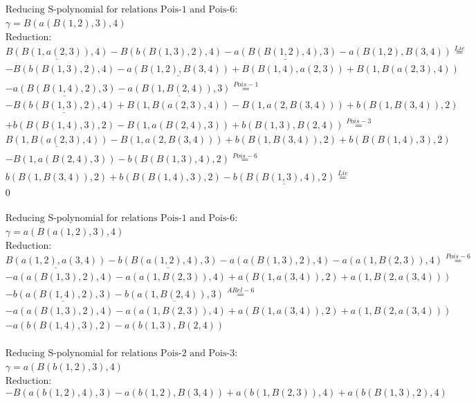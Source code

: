 \documentclass[11pt]{amsart}
\begin{document}
\begin{align*} 
& \text{Reducing S-polynomial for relations Pois-1 and Pois-6:} \\ 
& \gamma = B(a(B(1,2),3),4) \\ 
& \text{Reduction}: \\&\underline{B(B(1,a(2,3)),4)} - B(b(B(1,3),2),4) - \underline{a(B(B(1,2),4),3)} - a(B(1,2),B(3,4)) \stackrel{ Lie }{=}  \\ 
& - B(b(B(1,3),2),4) - \underline{a(B(1,2),B(3,4))} + B(B(1,4),a(2,3)) + B(1,B(a(2,3),4))\\ 
 &  - \underline{a(B(B(1,4),2),3)} - \underline{a(B(1,B(2,4)),3)} \stackrel{ Pois-1 }{=}  \\ 
& - \underline{B(b(B(1,3),2),4)} + B(1,B(a(2,3),4)) - B(1,a(2,B(3,4))) + b(B(1,B(3,4)),2)\\ 
 &  + b(B(B(1,4),3),2) - B(1,a(B(2,4),3)) + b(B(1,3),B(2,4)) \stackrel{ Pois-3 }{=}  \\ 
&\underline{B(1,B(a(2,3),4))} - B(1,a(2,B(3,4))) + b(B(1,B(3,4)),2) + b(B(B(1,4),3),2)\\ 
 &  - B(1,a(B(2,4),3)) - b(B(B(1,3),4),2) \stackrel{ Pois-6 }{=}  \\ 
&b(B(1,B(3,4)),2) + b(B(B(1,4),3),2) - \underline{b(B(B(1,3),4),2)} \stackrel{ Lie }{=}  \\ 
&0\\ 
\end{align*} 
 
\begin{align*} 
& \text{Reducing S-polynomial for relations Pois-1 and Pois-6:} \\ 
& \gamma = a(B(a(1,2),3),4) \\ 
& \text{Reduction}: \\&\underline{B(a(1,2),a(3,4))} - \underline{b(B(a(1,2),4),3)} - a(a(B(1,3),2),4) - a(a(1,B(2,3)),4) \stackrel{ Pois-6 }{=}  \\ 
& - a(a(B(1,3),2),4) - a(a(1,B(2,3)),4) + a(B(1,a(3,4)),2) + a(1,B(2,a(3,4)))\\ 
 &  - \underline{b(a(B(1,4),2),3)} - \underline{b(a(1,B(2,4)),3)} \stackrel{ ARel-6 }{=}  \\ 
& - a(a(B(1,3),2),4) - a(a(1,B(2,3)),4) + a(B(1,a(3,4)),2) + a(1,B(2,a(3,4)))\\ 
 &  - a(b(B(1,4),3),2) - a(b(1,3),B(2,4))\\ 
\end{align*} 
 
\begin{align*} 
& \text{Reducing S-polynomial for relations Pois-2 and Pois-3:} \\ 
& \gamma = a(B(b(1,2),3),4) \\ 
& \text{Reduction}: \\& - B(a(b(1,2),4),3) - a(b(1,2),B(3,4)) + a(b(1,B(2,3)),4) + a(b(B(1,3),2),4)\\ 
\end{align*} 
 
\end{document}
